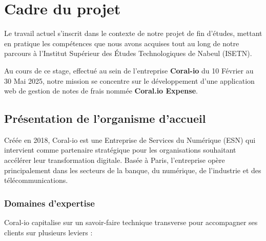 \documentclass[12pt,a4paper]{report}
\begin{document}
\section{Cadre du projet}

Le travail actuel s'inscrit dans le contexte de notre projet de fin d'études, mettant en pratique les compétences que nous avons acquises tout au long de notre parcours à l'Institut Supérieur des Études Technologiques de Nabeul (ISETN).



Au cours de ce stage, effectué au sein de l'entreprise \textbf{Coral-io} du 10 Février au 30 Mai 2025, notre mission se concentre sur le développement d'une application web de gestion de notes de frais nommée \textbf{Coral.io Expense}.





\subsection{Présentation de l'organisme d'accueil}




Créée en 2018, Coral-io est une Entreprise de Services du Numérique (ESN) qui intervient comme partenaire stratégique pour les organisations souhaitant accélérer leur transformation digitale. Basée à Paris, l'entreprise opère principalement dans les secteurs de la banque, du numérique, de l'industrie et des télécommunications.



\vspace{0.2cm}
\subsubsection{Domaines d'expertise}

Coral-io capitalise sur un savoir-faire technique transverse pour accompagner ses clients sur plusieurs leviers :
\end{document}
